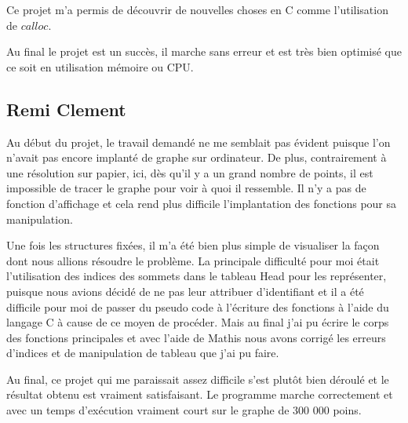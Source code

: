 \documentclass{article}
\begin{document}
Ce projet m'a permis de découvrir de nouvelles choses en C comme l'utilisation de $calloc$. 

Au final le projet est un succès, il marche sans erreur et est très bien optimisé que ce soit en utilisation mémoire ou CPU. 

\subsection{Remi Clement}

 	Au début du projet, le travail demandé ne me semblait pas évident puisque l'on n’avait pas encore implanté de graphe sur ordinateur. De plus, contrairement à une résolution sur papier, ici, dès qu'il y a un grand nombre de points, il est impossible de tracer le graphe pour voir à quoi il ressemble. Il n'y a pas de fonction d'affichage et cela rend plus difficile l'implantation des fonctions pour sa manipulation.
 	
 	Une fois les structures fixées, il m’a été bien plus simple de visualiser la façon dont nous allions résoudre le problème. La principale difficulté pour moi était l’utilisation des indices des sommets dans le tableau Head pour les représenter, puisque nous avions décidé de ne pas leur attribuer d’identifiant et il a été difficile pour moi de passer du pseudo code à l’écriture des fonctions à l’aide du langage C à cause de ce moyen de procéder. Mais au final j’ai pu écrire le corps des fonctions principales et avec l’aide de Mathis nous avons corrigé les erreurs d’indices et de manipulation de tableau que j’ai pu faire.
 	
	Au final, ce projet qui me paraissait assez difficile s’est plutôt bien déroulé et le résultat obtenu est vraiment satisfaisant. Le programme marche correctement et avec un temps d’exécution vraiment court sur le graphe de 300 000 poins.
\end{document}
